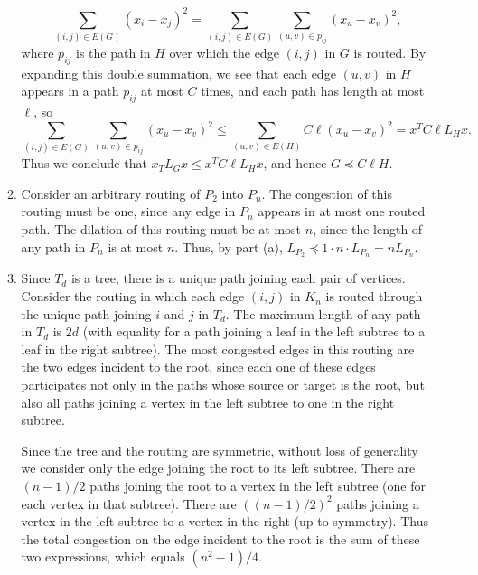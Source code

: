 \documentclass{article}
\newcommand{\1}{\mathbf{1}}
\newcommand{\0}{\mathbf{0}}
\begin{document}
\begin{enumerate}
\begin{enumerate}
\begin{equation*}
      \sum_{(i, j) \in E(G)} (x_i - x_j)^2 = \sum_{(i, j) \in E(G)} \sum_{(u, v) \in p_{ij}} (x_u - x_v)^2,
    \end{equation*}
    where $p_{ij}$ is the path in $H$ over which the edge $(i, j)$ in $G$ is routed.
    By expanding this double summation, we see that each edge $(u, v)$ in $H$ appears in a path $p_{ij}$ at most $C$ times, and each path has length at most $\ell$, so
    \begin{equation*}
      \sum_{(i, j) \in E(G)} \sum_{(u, v) \in p_{ij}} (x_u - x_v)^2 \leq \sum_{(u, v) \in E(H)} C \ell (x_u - x_v)^2 = x^T C \ell L_H x.
    \end{equation*}
    Thus we conclude that $x_T L_G x \leq x^T C \ell L_H x$, and hence $G \preceq C \ell H$.
  \item
    Consider an arbitrary routing of $P_2$ into $P_n$.
    The congestion of this routing must be one, since any edge in $P_n$ appears in at most one routed path.
    The dilation of this routing must be at most $n$, since the length of any path in $P_n$ is at most $n$.
    Thus, by part (a), $L_{P_2} \preceq 1 \cdot n \cdot L_{P_n} = n L_{P_n}$.
  \item
    Since $T_d$ is a tree, there is a unique path joining each pair of vertices.
    Consider the routing in which each edge $(i, j)$ in $K_n$ is routed through the unique path joining $i$ and $j$ in $T_d$.
    The maximum length of any path in $T_d$ is $2d$ (with equality for a path joining a leaf in the left subtree to a leaf in the right subtree).
    The most congested edges in this routing are the two edges incident to the root, since each one of these edges participates not only in the paths whose source or target is the root, but also all paths joining a vertex in the left subtree to one in the right subtree.

    Since the tree and the routing are symmetric, without loss of generality we consider only the edge joining the root to its left subtree.
    There are $(n - 1) / 2$ paths joining the root to a vertex in the left subtree (one for each vertex in that subtree).
    There are $((n - 1) / 2)^2$ paths joining a vertex in the left subtree to a vertex in the right (up to symmetry).
    Thus the total congestion on the edge incident to the root is the sum of these two expressions, which equals $(n^2 - 1) / 4$.


\end{enumerate}
\end{enumerate}
\end{document}
